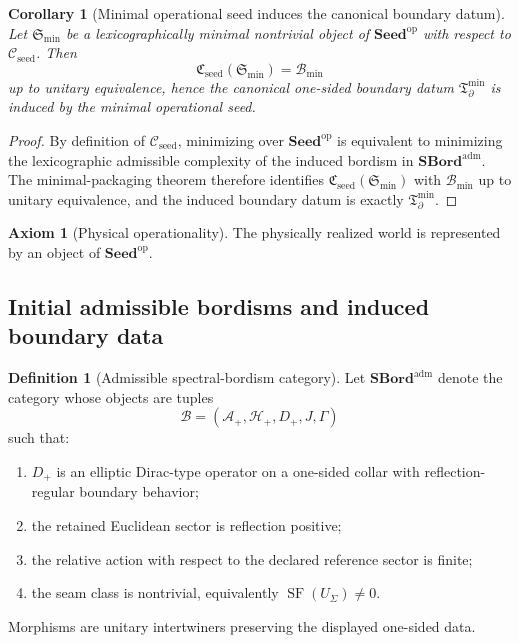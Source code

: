 \documentclass[11pt,a4paper]{article}
\newtheorem{corollary}[theorem]{Corollary}
\theoremstyle{definition}
\newtheorem{definition}[theorem]{Definition}
\newtheorem{axiom}[theorem]{Axiom}
\theoremstyle{remark}
\DeclareMathOperator{\SF}{SF}
\newcommand{\Tbound}{\mathfrak T_{\partial}^{\min}}
\newcommand{\Seedop}{\mathbf{Seed}^{\mathrm{op}}}
\newcommand{\Cseed}{\mathfrak C_{\mathrm{seed}}}
\begin{document}
\begin{corollary}[Minimal operational seed induces the canonical boundary datum]
\label{cor:minimal-operational-seed}
Let $\mathfrak S_{\min}$ be a lexicographically minimal nontrivial object of $\Seedop$ with respect
to $\mathcal C_{\mathrm{seed}}$. Then
\[
\Cseed(\mathfrak S_{\min})=\mathcal B_{\min}
\]
up to unitary equivalence, hence the canonical one-sided boundary datum $\Tbound$ is induced by the
minimal operational seed.
\end{corollary}

\begin{proof}
By definition of $\mathcal C_{\mathrm{seed}}$, minimizing over $\Seedop$ is equivalent to minimizing
the lexicographic admissible complexity of the induced bordism in
$\mathbf{SBord}^{\mathrm{adm}}$. The minimal-packaging theorem therefore identifies
$\Cseed(\mathfrak S_{\min})$ with $\mathcal B_{\min}$ up to unitary equivalence, and the induced
boundary datum is exactly $\Tbound$.
\end{proof}

\begin{axiom}[Physical operationality]
\label{ax:physical-operationality}
The physically realized world is represented by an object of $\Seedop$.
\end{axiom}

\subsection{Initial admissible bordisms and induced boundary data}

\begin{definition}[Admissible spectral-bordism category]
\label{def:admissible-spectral-bordism-category}
Let $\mathbf{SBord}^{\mathrm{adm}}$ denote the category whose objects are tuples
\[
\mathcal B=(\mathcal A_+,\mathcal H_+,D_+,J,\Gamma)
\]
such that:
\begin{enumerate}[label=(\roman*), leftmargin=1.5em, topsep=3pt, itemsep=2pt]
    \item $D_+$ is an elliptic Dirac-type operator on a one-sided collar with reflection-regular
    boundary behavior;
    \item the retained Euclidean sector is reflection positive;
    \item the relative action with respect to the declared reference sector is finite;
    \item the seam class is nontrivial, equivalently $\SF(U_\Sigma)\neq 0$.
\end{enumerate}
Morphisms are unitary intertwiners preserving the displayed one-sided data.
\end{definition}
\end{document}
